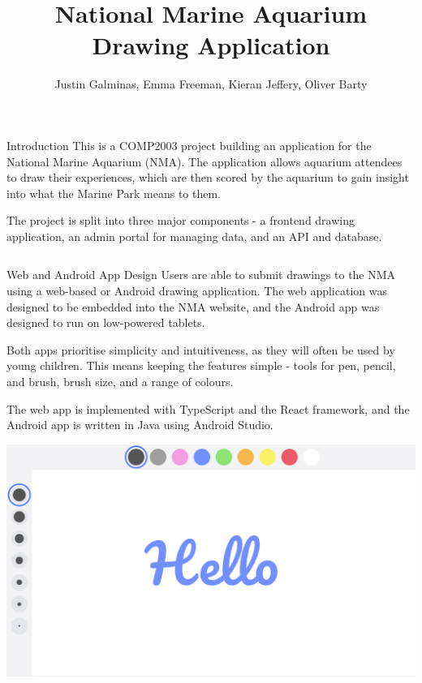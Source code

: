 \documentclass{beamer}
\author{Justin Galminas, \: Emma Freeman, \: Kieran Jeffery, \: Oliver Barty}
\title{National Marine Aquarium Drawing Application}
\begin{document}
\begin{frame}[fragile]\centering

\begin{block}{Introduction}
    This is a COMP2003 project building an application for the National Marine Aquarium (NMA). The application allows aquarium attendees to draw their experiences, which are then scored by the aquarium to gain insight into what the Marine Park means to them.
    \vspace{1ex}

    The project is split into three major components - a frontend drawing application, an admin portal for managing data, and an API and database.
\end{block}

\begin{columns}[T]

\begin{column}{.46\textwidth}

    \begin{block}{Web and Android App Design}
        Users are able to submit drawings to the NMA using a web-based or Android drawing application. The web application was designed to be embedded into the NMA website, and the Android app was designed to run on low-powered tablets.
        \vspace{1ex}

        Both apps prioritise simplicity and intuitiveness, as they will often be used by young children. This means keeping the features simple - tools for pen, pencil, and brush, brush size, and a range of colours.
        \vspace{1ex}

        The web app is implemented with TypeScript and the React framework, and the Android app is written in Java using Android Studio.
        \vspace{1ex}

        \begin{center}
            \includegraphics[width=0.75\linewidth]{images/web-app.png}
        \end{center}
    \end{block}


\end{column}
\end{columns}
\end{frame}
\end{document}
